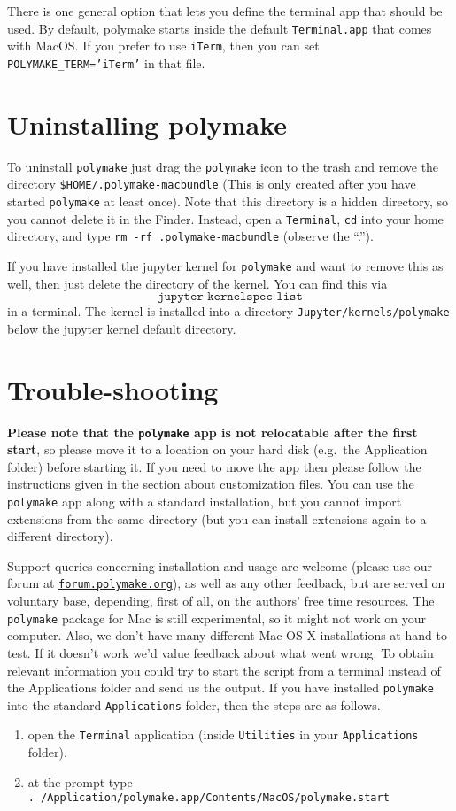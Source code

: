\documentclass[a4paper]{amsart}
\newcommand{\polymake}{\texttt{polymake}\xspace}
\begin{document}
There is one general option that lets you define the terminal app that should be used. By default, polymake starts inside the default \texttt{Terminal.app} that comes with MacOS. If you prefer to use \texttt{iTerm}, then you can set \texttt{POLYMAKE\_TERM='iTerm'} in that file. 


\section*{Uninstalling polymake}

To uninstall \polymake just drag the \polymake icon to the trash and remove the directory \texttt{\${HOME}/.polymake-macbundle} (This is only created after you have started \polymake at least once). Note that this directory is a hidden directory, so you cannot delete it in the Finder. Instead, open a \texttt{Terminal}, \texttt{cd} into your home directory, and type \texttt{rm -rf .polymake-macbundle} (observe the ``.'').

If you have installed the jupyter kernel for \polymake and want to remove this as well, then just delete the directory of the kernel. You can find this via
\[\texttt{jupyter kernelspec list}\]
in a terminal. The kernel is installed into a directory \texttt{Jupyter/kernels/polymake} below the jupyter kernel default directory.

\section*{Trouble-shooting}

\textbf{Please note that the \polymake app is not relocatable after the first start}, so please move it to a location on your hard disk (e.g.\ the Application folder) before starting it. If you need to move the app then please follow the instructions given in the section about customization files. You can use the \polymake app along with a standard installation, but you cannot import extensions from the same directory (but you can install extensions again to a different directory).

Support queries concerning installation and usage are welcome (please use our forum at \href{http://forum.polymake.org}{\tt forum.polymake.org}), as well as any other feedback, but are served on voluntary base, depending, first of all, on the authors' free time resources.  The \polymake package for Mac is still experimental, so it might not work on your computer. Also, we don't have many different Mac OS X installations at hand to test. If it doesn't work we'd value feedback about what went wrong. To obtain relevant information you could try to start the script from a terminal instead of the Applications folder and send us the output. If you have installed \polymake into the standard \texttt{Applications} folder, then the steps are as follows.
\begin{enumerate}
\item open the \texttt{Terminal} application (inside \texttt{Utilities} in your \texttt{Applications} folder).
\item at the prompt type\\
 \texttt{. /Application/polymake.app/Contents/MacOS/polymake.start}
\end{enumerate}
\end{document}
